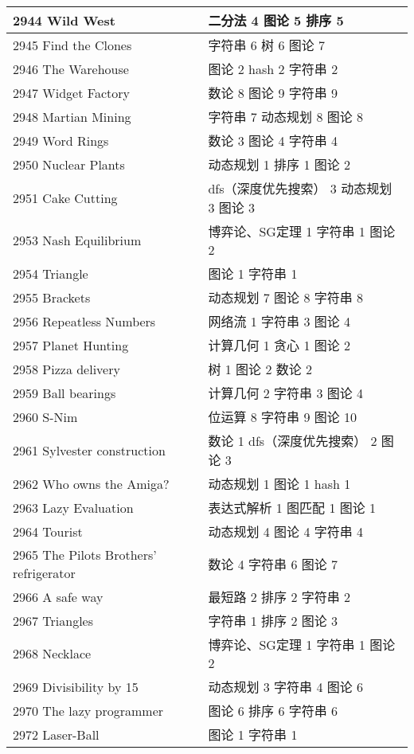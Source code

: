 \begin{longtable}{| p{} | p{} |}
 2944 Wild West  & 二分法 4 图论 5 排序 5 \\ \hline
 2945 Find the Clones  & 字符串 6 树 6 图论 7 \\ \hline
 2946 The Warehouse  & 图论 2 hash 2 字符串 2 \\ \hline
 2947 Widget Factory  & 数论 8 图论 9 字符串 9 \\ \hline
 2948 Martian Mining  & 字符串 7 动态规划 8 图论 8 \\ \hline
 2949 Word Rings  & 数论 3 图论 4 字符串 4 \\ \hline
 2950 Nuclear Plants  & 动态规划 1 排序 1 图论 2 \\ \hline
 2951 Cake Cutting  & dfs（深度优先搜索） 3 动态规划 3 图论 3 \\ \hline
 2953 Nash Equilibrium  & 博弈论、SG定理 1 字符串 1 图论 2 \\ \hline
 2954 Triangle  & 图论 1 字符串 1 \\ \hline
 2955 Brackets  & 动态规划 7 图论 8 字符串 8 \\ \hline
 2956 Repeatless Numbers  & 网络流 1 字符串 3 图论 4 \\ \hline
 2957 Planet Hunting  & 计算几何 1 贪心 1 图论 2 \\ \hline
 2958 Pizza delivery  & 树 1 图论 2 数论 2 \\ \hline
 2959 Ball bearings  & 计算几何 2 字符串 3 图论 4 \\ \hline
 2960 S-Nim  & 位运算 8 字符串 9 图论 10 \\ \hline
 2961 Sylvester construction  & 数论 1 dfs（深度优先搜索） 2 图论 3 \\ \hline
 2962 Who owns the Amiga?  & 动态规划 1 图论 1 hash 1 \\ \hline
 2963 Lazy Evaluation  & 表达式解析 1 图匹配 1 图论 1 \\ \hline
 2964 Tourist  & 动态规划 4 图论 4 字符串 4 \\ \hline
 2965 The Pilots Brothers' refrigerator  & 数论 4 字符串 6 图论 7 \\ \hline
 2966 A safe way  & 最短路 2 排序 2 字符串 2 \\ \hline
 2967 Triangles  & 字符串 1 排序 2 图论 3 \\ \hline
 2968 Necklace  & 博弈论、SG定理 1 字符串 1 图论 2 \\ \hline
 2969 Divisibility by 15  & 动态规划 3 字符串 4 图论 6 \\ \hline
 2970 The lazy programmer  & 图论 6 排序 6 字符串 6 \\ \hline
 2972 Laser-Ball  & 图论 1 字符串 1 \\ \hline

\end{longtable}
